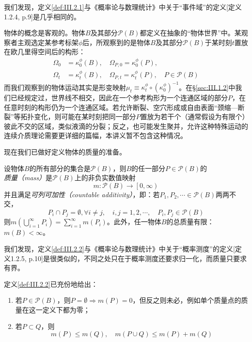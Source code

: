 \documentclass[../main.tex]{subfiles}
\begin{document}
我们发现，定义\ref{def:III.2.1}与《概率论与数理统计》中关于“事件域”的定义\cite{何春雄2012}[定义1.2.4, p.9]是几乎相同的。

物体的概念是客观的。物体$B$及其部分$\mathcal{P}\left(B\right)$都定义在抽象的“物体世界”中。某观察者主观选定某参考标架$\phi$后，所观察到的是物体$B$及其部分$\mathcal{P}\left(B\right)$于某时刻$t$置放在欧几里得空间后的构形：
\begin{align*}
    \Omega_0 & =\kappa_0^\phi\left(B\right),\quad\Omega_{P,0}=\kappa_0^\phi\left(P\right),                                    \\
    \Omega_t & =\kappa_t^\phi\left(B\right),\quad\Omega_{P,t}=\kappa_t^\phi\left(P\right),\quad P\in\mathcal{P}\left(B\right)
\end{align*}
而我们观察到的物体运动其实是形变映射$\mu_t\equiv\kappa_t^\phi\circ\left(\kappa_0^{\phi}\right)^{-1}$。在\S\ref{sec:III.1.2}中我们已经规定过，世界线不相交，因此在一个参考构形为一个连通区域的部分$P$，在任意时刻的构形仍为一个连通区域。若允许断裂、空穴形成或自由表面“颈缩—断裂”等拓扑变化，则可能在某时刻把同一部分$P$置放为若干个（通常假设为有限个）彼此不交的区域，类似液滴的分裂；反之，也可能发生聚并，允许这种特殊运动的连续介质理论需要更详细的篇幅，本讲义暂不包含这种情况。

现在我们已做好定义物体的质量的准备。

\begin{definition}[连续介质物体的质量]\label{def:III.2.2}
    设物体$B$的所有部分的集合是$\mathcal{P}\left(B\right)$，则$B$的任一部分$P\in\mathcal{P}\left(B\right)$的\emph{质量（mass）}是$\mathcal{P}\left(B\right)$上的非负实数值映射
    \[m:\mathcal{P}\left(B\right)\rightarrow\left[0,\infty\right)\]
    并且满足\emph{可列可加性（countable additivity）}，即：若$P_1,P_2,\cdots\in\mathcal{P}\left(B\right)$两两不交，
    \[P_i\cap P_j=\emptyset,\forall i\neq j,\quad i,j=1,2,\cdots,\quad P_i, P_j\in\mathcal{P}\left(B\right)\]
    则$m\left(\bigcup_{i=1}^\infty P_i\right)=\sum_{i=1}^\infty m\left(P_i\right)$。此外，任一物体$B$的总质量有限：$m\left(B\right)<\infty$。
\end{definition}

我们发现，定义\ref{def:III.2.2}与《概率论与数理统计》中关于“概率测度”的定义\cite{何春雄2012}[定义1.2.5, p.10]是很类似的，不同之处只在于概率测度还要求归一化，而质量只要求有界。

定义\ref{def:III.2.2}已充份地给出：
\begin{enumerate}
    \item 若$P\in\mathcal{P}\left(B\right)$，则$P=\emptyset\Rightarrow m\left(P\right)=0$，但反之则未必，例如单个质量点的质量在这一定义下都为零；
    \item 若$P\subset Q$，则
          \[m\left(P\right)\leq m\left(Q\right),\quad m\left(P\cup Q\right)\leq m\left(P\right)+m\left(Q\right)\]
\end{enumerate}
\end{document}
